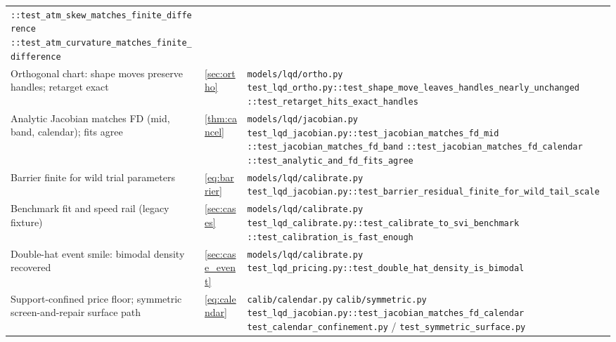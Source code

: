 \documentclass[11pt]{article}
\begin{document}
\begin{longtable}{@{}p{}p{}p{}@{}}
\nolinkurl{::test_atm_skew_matches_finite_difference}\newline
\nolinkurl{::test_atm_curvature_matches_finite_difference}\\
\addlinespace
Orthogonal chart: shape moves preserve handles; retarget exact &
\cref{sec:ortho} &
\nolinkurl{models/lqd/ortho.py}\newline
\nolinkurl{test_lqd_ortho.py::test_shape_move_leaves_handles_nearly_unchanged}\newline
\nolinkurl{::test_retarget_hits_exact_handles}\\
\addlinespace
Analytic Jacobian matches FD (mid, band, calendar); fits agree &
\cref{thm:cancel} &
\nolinkurl{models/lqd/jacobian.py}\newline
\nolinkurl{test_lqd_jacobian.py::test_jacobian_matches_fd_mid}\newline
\nolinkurl{::test_jacobian_matches_fd_band}\newline
\nolinkurl{::test_jacobian_matches_fd_calendar}\newline
\nolinkurl{::test_analytic_and_fd_fits_agree}\\
\addlinespace
Barrier finite for wild trial parameters &
\eqref{eq:barrier} &
\nolinkurl{models/lqd/calibrate.py}\newline
\nolinkurl{test_lqd_jacobian.py::test_barrier_residual_finite_for_wild_tail_scale}\\
\addlinespace
Benchmark fit and speed rail (legacy fixture) &
\cref{sec:cases} &
\nolinkurl{models/lqd/calibrate.py}\newline
\nolinkurl{test_lqd_calibrate.py::test_calibrate_to_svi_benchmark}\newline
\nolinkurl{::test_calibration_is_fast_enough}\\
\addlinespace
Double-hat event smile: bimodal density recovered &
\cref{sec:case_event} &
\nolinkurl{models/lqd/calibrate.py}\newline
\nolinkurl{test_lqd_pricing.py::test_double_hat_density_is_bimodal}\\
\addlinespace
Support-confined price floor; symmetric screen-and-repair surface path &
\eqref{eq:calendar} &
\nolinkurl{calib/calendar.py}\newline
\nolinkurl{calib/symmetric.py}\newline
\nolinkurl{test_lqd_jacobian.py::test_jacobian_matches_fd_calendar}\newline
\nolinkurl{test_calendar_confinement.py} /
\nolinkurl{test_symmetric_surface.py}\newline

\end{longtable}
\end{document}
